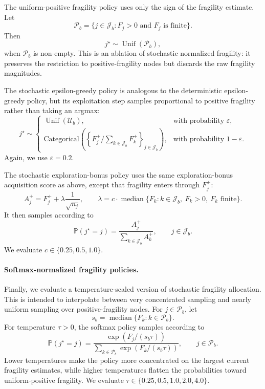\documentclass[11pt]{article}
\begin{document}
The uniform-positive fragility policy uses only the sign of the fragility estimate. Let
\[
\mathcal{P}_b
=
\{j\in\mathcal{J}_b:F_j>0 \text{ and } F_j \text{ is finite}\}.
\]
Then
\[
j^\star \sim \operatorname{Unif}(\mathcal{P}_b),
\]
when $\mathcal{P}_b$ is non-empty. This is an ablation of stochastic normalized fragility: it preserves the restriction to positive-fragility nodes but discards the raw fragility magnitudes.

The stochastic epsilon-greedy policy is analogous to the deterministic epsilon-greedy policy, but its exploitation step samples proportional to positive fragility rather than taking an argmax:
\[
j^\star \sim
\begin{cases}
\operatorname{Unif}(\mathcal{U}_b), & \text{with probability } \varepsilon,\\
\text{Categorical}\left(\left\{F_j^+/\sum_{k\in\mathcal{J}_b}F_k^+\right\}_{j\in\mathcal{J}_b}\right), & \text{with probability } 1-\varepsilon.
\end{cases}
\]
Again, we use $\varepsilon=0.2$.

The stochastic exploration-bonus policy uses the same exploration-bonus acquisition score as above, except that fragility enters through $F_j^+$:
\[
A_j^{+}
=
F_j^+
+ \lambda\frac{1}{\sqrt{n_j}},
\qquad
\lambda
=
c\cdot \operatorname{median}\{F_k:k\in\mathcal{J}_b,\ F_k>0,\ F_k \text{ finite}\}.
\]
It then samples according to
\[
\mathbb{P}(j^\star=j)
=
\frac{A_j^{+}}{\sum_{k\in\mathcal{J}_b}A_k^{+}},
\qquad j\in\mathcal{J}_b.
\]
We evaluate $c\in\{0.25,0.5,1.0\}$.

\paragraph{Softmax-normalized fragility policies.}
Finally, we evaluate a temperature-scaled version of stochastic fragility allocation. This is intended to interpolate between very concentrated sampling and nearly uniform sampling over positive-fragility nodes. For $j\in\mathcal{P}_b$, let
\[
s_b = \operatorname{median}\{F_k:k\in\mathcal{P}_b\}.
\]
For temperature $\tau>0$, the softmax policy samples according to
\[
\mathbb{P}(j^\star=j)
=
\frac{
\exp\left(F_j/(s_b\tau)\right)
}{
\sum_{k\in\mathcal{P}_b}\exp\left(F_k/(s_b\tau)\right)
},
\qquad j\in\mathcal{P}_b.
\]
Lower temperatures make the policy more concentrated on the largest current fragility estimates, while higher temperatures flatten the probabilities toward uniform-positive fragility. We evaluate $\tau\in\{0.25,0.5,1.0,2.0,4.0\}$.
\end{document}
